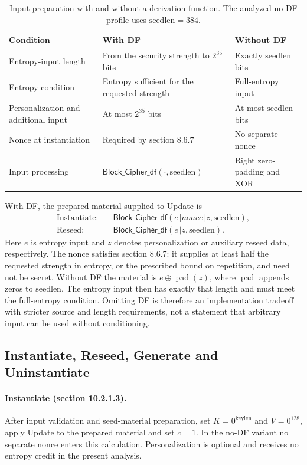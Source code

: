 \documentclass[journal=tosc,preprint,floatrow,nohyperxmp]{iacrtrans}
\numberwithin{lemma}{section}
\numberwithin{proposition}{section}
\newcommand{\DF}{\ensuremath{\mathsf{Block\_Cipher\_df}}}
\newcommand{\pad}{\operatorname{pad}}
\numberwithin{equation}{section}
\theoremstyle{definition}
\numberwithin{definition}{section}
\theoremstyle{plain}
\begin{document}
\begin{table}[htbp]
\caption{Input preparation with and without a derivation function. The analyzed no-DF profile uses $\mathrm{seedlen}=384$.}\label{tab:df-profiles}
\centering\small
\begin{tabularx}{\linewidth}{@{}L{29mm}XX@{}}
\toprule
Condition & With DF & Without DF\\
\midrule
Entropy-input length & From the security strength to $2^{35}$ bits & Exactly $\mathrm{seedlen}$ bits\\[3pt]
Entropy condition & Entropy sufficient for the requested strength & Full-entropy input\\[3pt]
Personalization and additional input & At most $2^{35}$ bits & At most $\mathrm{seedlen}$ bits\\[3pt]
Nonce at instantiation & Required by section 8.6.7 & No separate nonce\\[3pt]
Input processing & $\DF(\cdot,\mathrm{seedlen})$ & Right zero-padding and XOR\\
\bottomrule
\end{tabularx}
\end{table}

With DF, the prepared material supplied to Update is
\begin{align*}
 \text{Instantiate:}\quad &\DF(e\Vert\mathit{nonce}\Vert z,\mathrm{seedlen}),\\
 \text{Reseed:}\quad &\DF(e\Vert z,\mathrm{seedlen}).
\end{align*}
Here $e$ is entropy input and $z$ denotes personalization or auxiliary reseed data, respectively. The nonce satisfies section 8.6.7: it supplies at least half the requested strength in entropy, or the prescribed bound on repetition, and need not be secret. Without DF the material is $e\oplus\pad(z)$, where $\pad$ appends zeros to $\mathrm{seedlen}$. The entropy input then has exactly that length and must meet the full-entropy condition. Omitting DF is therefore an implementation tradeoff with stricter source and length requirements, not a statement that arbitrary input can be used without conditioning.

\subsection{Instantiate, Reseed, Generate and Uninstantiate}
\paragraph{Instantiate (section 10.2.1.3).}
After input validation and seed-material preparation, set $K=0^{\mathrm{keylen}}$ and $V=0^{128}$, apply Update to the prepared material and set $c=1$. In the no-DF variant no separate nonce enters this calculation. Personalization is optional and receives no entropy credit in the present analysis.
\end{document}
